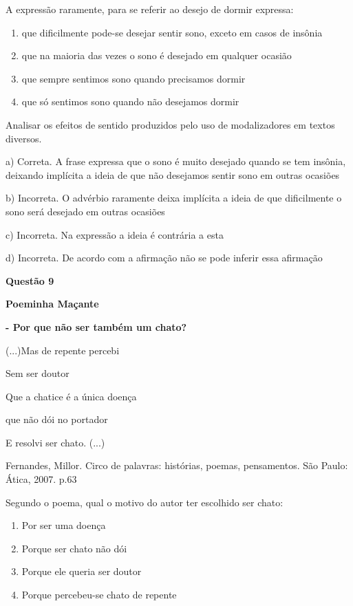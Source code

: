 A expressão raramente, para se referir ao desejo de dormir expressa:

\begin{enumerate}
\def\labelenumi{\alph{enumi})}
\item
  que dificilmente pode-se desejar sentir sono, exceto em casos de
  insônia
\item
  que na maioria das vezes o sono é desejado em qualquer ocasião
\item
  que sempre sentimos sono quando precisamos dormir
\item
  que só sentimos sono quando não desejamos dormir
\end{enumerate}

Analisar os efeitos de sentido produzidos pelo uso de modalizadores em
textos diversos.

a) Correta. A frase expressa que o sono é muito desejado quando se tem
insônia, deixando implícita a ideia de que não desejamos sentir sono em
outras ocasiões

b) Incorreta. O advérbio raramente deixa implícita a ideia de que
dificilmente o sono será desejado em outras ocasiões

c) Incorreta. Na expressão a ideia é contrária a esta

d) Incorreta. De acordo com a afirmação não se pode inferir essa
afirmação

\textbf{Questão 9}

\textbf{Poeminha Maçante}

\textbf{- Por que não ser também um chato?}

(...)Mas de repente percebi

Sem ser doutor

Que a chatice é a única doença

que não dói no portador

E resolvi ser chato. (...)

Fernandes, Millor. Circo de palavras: histórias, poemas, pensamentos.
São Paulo: Ática, 2007. p.63

Segundo o poema, qual o motivo do autor ter escolhido ser chato:

\begin{enumerate}
\def\labelenumi{\alph{enumi})}
\item
  Por ser uma doença
\item
  Porque ser chato não dói
\item
  Porque ele queria ser doutor
\item
  Porque percebeu-se chato de repente
\end{enumerate}

